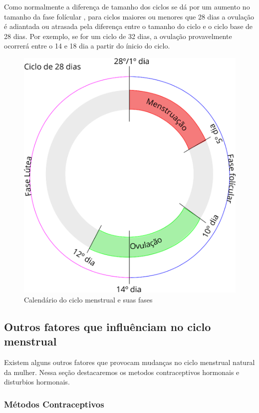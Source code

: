 Como normalmente a diferença de tamanho dos ciclos se dá por um aumento no tamanho da fase folícular \cite{lenton1984a}, para ciclos maiores ou menores que 28 dias a ovulação é adiantada ou atrasada pela diferença entre o tamanho do ciclo e o ciclo base de 28 dias. Por exemplo, se for um ciclo de 32 dias, a ovulação provavelmente ocorrerá entre o 14 e 18 dia a partir do ínicio do ciclo.

\begin{figure}[h]
	\centering
	\includegraphics[keepaspectratio=true,scale=0.3]{figuras/calendario.eps}
	\caption{Calendário do ciclo menstrual e suas fases}
        \label{fig02}
\end{figure}

\subsection{Outros fatores que influênciam no ciclo menstrual}

Existem alguns outros fatores que provocam mudanças no ciclo menstrual natural da mulher. Nessa seção destacaremos os metodos contraceptivos hormonais e disturbios hormonais.

\subsubsection{Métodos Contraceptivos}

